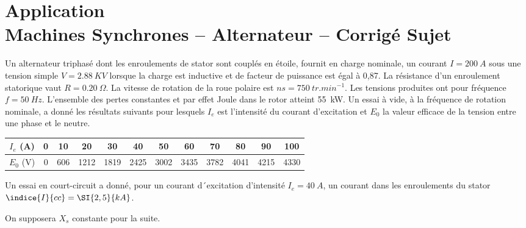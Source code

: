 \chapter*{Application  \\ 
Machines Synchrones -- Alternateur
-- \ifprof Corrigé \else Sujet \fi}

\iflivret {} \else
\ifprof  {} \else \fi
\fi

\setcounter{question}{0}


Un alternateur triphasé dont les enroulements de stator sont couplés en étoile, fournit en charge nominale, un courant $I = \SI{200}{A}$ sous une tension simple $V = \SI{2,88}{KV}$ lorsque la charge est inductive et de facteur de puissance est égal à 0,87. 
La résistance d’un enroulement statorique vaut $R = \SI{0,20}{\Omega}$. 
La vitesse de rotation de la roue polaire est $ns = \SI{750}{tr.min^{-1}}$.
Les tensions produites ont pour fréquence $f = \SI{50}{Hz}$. 
L’ensemble des pertes constantes et par effet Joule dans le rotor atteint \SI{55}{kW}. 
Un essai à vide, à la fréquence de rotation nominale, a donné les résultats suivants pour lesquels $I_e$ est l’intensité du courant d’excitation et $E_0$ la valeur efficace de la tension entre une phase et le neutre.


\begin{center}
\begin{tabular}{*{12}{c}}
\hline
$I_e$ (\si{A}) 	& 0	&10	& 20	& 30	& 40	& 50	& 60	& 70	& 80	& 90	& 100	\\
\hline
$E_0$ (\si{V})	& 0	& 606	& 1212	& 1819	& 2425	& 3002	& 3435	& 3782	& 4041	& 4215	& 4330	\\
\hline
\end{tabular}
\end{center}

Un essai en court-circuit a donné, pour un courant d´excitation d’intensité $I_e=\SI{40}{A}$, un courant dans les enroulements du stator $\indice{I}{cc}=\SI{2,5}{kA}$.



On supposera $X_s$ constante pour la suite.





\ifprof
\else
\begin{marginfigure}[-3cm]
\centering
\end{marginfigure}
\fi




